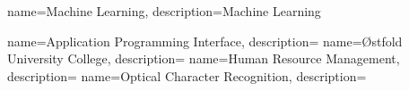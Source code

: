 \RequirePackage{glossaries}
\makeglossaries


{
    name=Machine Learning,
    description={Machine Learning}
}

{
    name=Application Programming Interface,
    description={}
}
{
    name=Østfold University College,
    description={}
}
{
    name=Human Resource Management,
    description={}
}
{
    name=Optical Character Recognition,
    description={}
}
